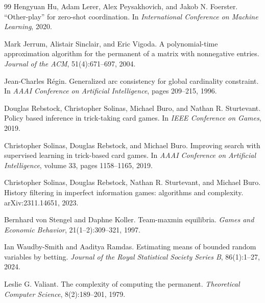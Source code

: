 \documentclass[11pt,letterpaper]{article}
\begin{document}
\begin{thebibliography}{99}
Hengyuan Hu, Adam Lerer, Alex Peysakhovich, and Jakob N. Foerster.
\newblock ``Other-play'' for zero-shot coordination.
\newblock In \emph{International Conference on Machine Learning}, 2020.

Mark Jerrum, Alistair Sinclair, and Eric Vigoda.
\newblock A polynomial-time approximation algorithm for the permanent of a
matrix with nonnegative entries.
\newblock \emph{Journal of the ACM}, 51(4):671--697, 2004.

Jean-Charles R\'egin.
\newblock Generalized arc consistency for global cardinality constraint.
\newblock In \emph{AAAI Conference on Artificial Intelligence}, pages
209--215, 1996.

Douglas Rebstock, Christopher Solinas, Michael Buro, and Nathan R. Sturtevant.
\newblock Policy based inference in trick-taking card games.
\newblock In \emph{IEEE Conference on Games}, 2019.

Christopher Solinas, Douglas Rebstock, and Michael Buro.
\newblock Improving search with supervised learning in trick-based card games.
\newblock In \emph{AAAI Conference on Artificial Intelligence}, volume 33,
pages 1158--1165, 2019.

Christopher Solinas, Douglas Rebstock, Nathan R. Sturtevant, and Michael Buro.
\newblock History filtering in imperfect information games: algorithms and
complexity.
\newblock arXiv:2311.14651, 2023.

Bernhard von Stengel and Daphne Koller.
\newblock Team-maxmin equilibria.
\newblock \emph{Games and Economic Behavior}, 21(1--2):309--321, 1997.

Ian Waudby-Smith and Aaditya Ramdas.
\newblock Estimating means of bounded random variables by betting.
\newblock \emph{Journal of the Royal Statistical Society Series B},
86(1):1--27, 2024.

Leslie G. Valiant.
\newblock The complexity of computing the permanent.
\newblock \emph{Theoretical Computer Science}, 8(2):189--201, 1979.

\end{thebibliography}
\end{document}
